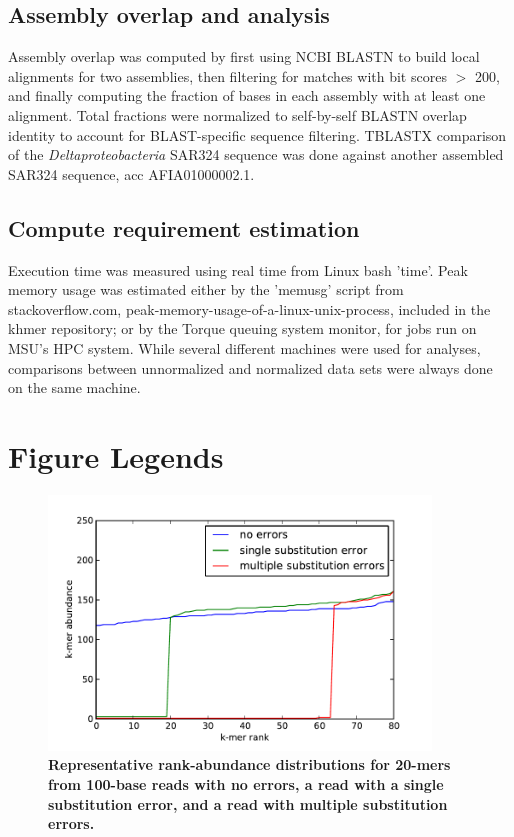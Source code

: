 \subsection{Assembly overlap and analysis}

Assembly overlap was computed by first using NCBI BLASTN to build local
alignments for two assemblies, then filtering for matches with bit scores
$>$ 200, and finally computing the fraction of bases in each assembly
with at least one alignment.  Total fractions were normalized to
self-by-self BLASTN overlap identity to account for BLAST-specific
sequence filtering.
TBLASTX comparison of the {\em Deltaproteobacteria} SAR324 sequence
was done against another assembled SAR324 sequence, acc AFIA01000002.1.

\subsection{Compute requirement estimation}

Execution time was measured using real time from Linux bash 'time'.
Peak memory usage was estimated either by the 'memusg' script from
stackoverflow.com, peak-memory-usage-of-a-linux-unix-process, included
in the khmer repository; or by the Torque queuing system monitor, for
jobs run on MSU's HPC system.  While several different machines were
used for analyses, comparisons between unnormalized and normalized
data sets were always done on the same machine.




\section{Figure Legends}

\begin{figure}[!ht]
\centerline{\includegraphics[width=4in]{diginorm-ranks.pdf}}
\caption{
{\bf Representative rank-abundance distributions for 20-mers from 100-base reads with no errors,
a read with a single substitution error, and a read with multiple
substitution errors.}}
\label{fig:rankabund}
\end{figure}

